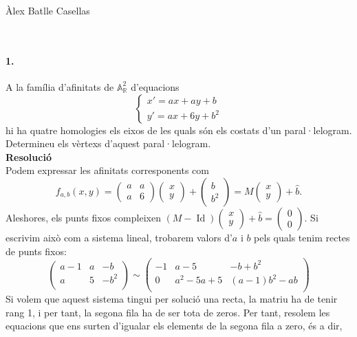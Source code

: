 \documentclass[11pt]{article}
\author{Àlex Batlle Casellas}
\newcommand{\af}{\mathbb{A}}
\DeclareMathOperator{\idn}{Id}
\begin{document}
\begin{small}
Àlex Batlle Casellas
\end{small}\\
\paragraph{1.}	A la família d'afinitats de $\af^2_{\mathbb{R}}$ d'equacions
\[
\begin{cases}
	x'=ax+ay+b\\
	y'=ax+6y+b^2
\end{cases}
\]
hi ha quatre homologies els eixos de les quals són els costats d'un paral·lelogram. Determineu els vèrtexs d'aquest paral·lelogram.\\
\textbf{Resolució}\\
Podem expressar les afinitats corresponents com
\[
f_{a,b}(x,y)=\begin{pmatrix} a & a\\ a & 6\end{pmatrix}\begin{pmatrix} x\\ y\end{pmatrix}+\begin{pmatrix} b \\ b^2\end{pmatrix}=M\begin{pmatrix} x\\ y\end{pmatrix}+\hat{b}.
\]
Aleshores, els punts fixos compleixen $(M-\idn)\begin{pmatrix}x\\ y\end{pmatrix}+\hat{b}=\begin{pmatrix}0\\ 0\end{pmatrix}.$ Si escrivim això com a sistema lineal, trobarem valors d'$a$ i $b$ pels quals tenim rectes de punts fixos:
\[
\left(\begin{array}{cc|c}
a-1&a&-b\\
a&5&-b^2\\
\end{array}\right)\sim
\left(\begin{array}{cc|c}
-1&a-5&-b+b^2\\
0&a^2-5a+5&(a-1)b^2-ab\\
\end{array}\right)
\]
Si volem que aquest sistema tingui per solució una recta, la matriu ha de tenir rang 1, i per tant, la segona fila ha de ser tota de zeros. Per tant, resolem les equacions que ens surten d'igualar els elements de la segona fila a zero, és a dir,
\end{document}
